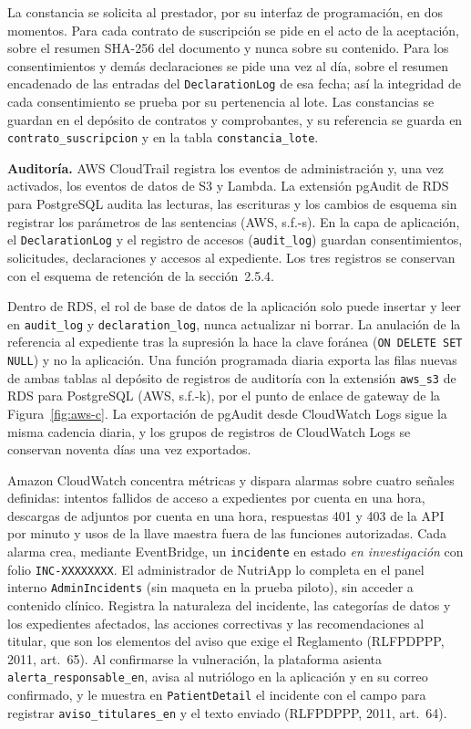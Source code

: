 \documentclass[12pt, a4paper]{article}
\begin{document}
La constancia se solicita al prestador, por su interfaz de programación,
en dos momentos. Para cada contrato de suscripción se pide en el acto de
la aceptación, sobre el resumen SHA-256 del documento y nunca sobre su
contenido. Para los consentimientos y demás declaraciones se pide una
vez al día, sobre el resumen encadenado de las entradas del
\texttt{DeclarationLog} de esa fecha; así la integridad de cada
consentimiento se prueba por su pertenencia al lote. Las constancias se
guardan en el depósito de contratos y comprobantes, y su referencia se
guarda en \texttt{contrato\_suscripcion} y en la tabla
\texttt{constancia\_lote}.

\textbf{Auditoría.} AWS CloudTrail registra los eventos de
administración y, una vez activados, los eventos de datos de S3 y
Lambda. La extensión pgAudit de RDS para PostgreSQL audita las lecturas,
las escrituras y los cambios de esquema sin registrar los parámetros de
las sentencias (AWS, s.f.-s). En la capa de aplicación, el
\texttt{DeclarationLog} y el registro de accesos (\texttt{audit\_log})
guardan consentimientos, solicitudes, declaraciones y accesos al
expediente. Los tres registros se conservan con el esquema de retención
de la sección~2.5.4.

Dentro de RDS, el rol de base de datos de la aplicación solo puede
insertar y leer en \texttt{audit\_log} y \texttt{declaration\_log},
nunca actualizar ni borrar. La anulación de la referencia al expediente
tras la supresión la hace la clave foránea (\texttt{ON DELETE SET NULL})
y no la aplicación. Una función programada diaria exporta las filas
nuevas de ambas tablas al depósito de registros de auditoría con la
extensión \texttt{aws\_s3} de RDS para PostgreSQL (AWS, s.f.-k), por el
punto de enlace de gateway de la Figura~\ref{fig:aws-c}. La exportación
de pgAudit desde CloudWatch Logs sigue la misma cadencia diaria, y los
grupos de registros de CloudWatch Logs se conservan noventa días una vez
exportados.

Amazon CloudWatch concentra métricas y dispara alarmas sobre cuatro
señales definidas: intentos fallidos de acceso a expedientes por cuenta
en una hora, descargas de adjuntos por cuenta en una hora, respuestas
401 y 403 de la API por minuto y usos de la llave maestra fuera de las
funciones autorizadas. Cada alarma crea, mediante EventBridge, un
\texttt{incidente} en estado \textit{en investigación} con folio
\texttt{INC-XXXXXXXX}. El administrador de NutriApp lo completa en el
panel interno \texttt{AdminIncidents} (sin maqueta en la prueba piloto),
sin acceder a contenido clínico. Registra la naturaleza del incidente,
las categorías de datos y los expedientes afectados, las acciones
correctivas y las recomendaciones al titular, que son los elementos del
aviso que exige el Reglamento (RLFPDPPP, 2011, art.~65). Al confirmarse
la vulneración, la plataforma asienta \texttt{alerta\_responsable\_en},
avisa al nutriólogo en la aplicación y en su correo confirmado, y le
muestra en \texttt{PatientDetail} el incidente con el campo para
registrar \texttt{aviso\_titulares\_en} y el texto enviado (RLFPDPPP,
2011, art.~64).
\end{document}
